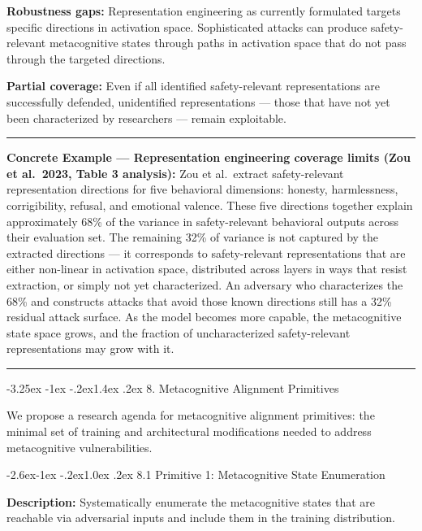 \documentclass[
  11pt,
]{article}
\makeatletter
\renewcommand\section{\@startsection{section}{1}{\z@}%
  {-3.25ex \@plus -1ex \@minus -.2ex}{1.4ex \@plus.2ex}%
  {\normalfont\sffamily\Large\bfseries}}
\renewcommand\subsection{\@startsection{subsection}{2}{\z@}%
  {-2.6ex\@plus -1ex \@minus -.2ex}{1.0ex \@plus .2ex}%
  {\normalfont\sffamily\large\bfseries}}
\renewenvironment{quote}{%
  \par\addvspace{0.7em}%
  \noindent\rule{\linewidth}{1.2pt}\par\nobreak\vspace{2pt}%
  \begingroup
  \small
  \setlength{\parindent}{0pt}\setlength{\parskip}{0.3em}%
  \setlength{\leftskip}{0.9em}\setlength{\rightskip}{0.4em}%
  \ignorespaces
}{%
  \par\endgroup\vspace{2pt}%
  \noindent\rule{\linewidth}{0.4pt}\par\addvspace{0.7em}%
}
\makeatother
\begin{document}
\textbf{Robustness gaps:} Representation engineering as currently
formulated targets specific directions in activation space.
Sophisticated attacks can produce safety-relevant metacognitive states
through paths in activation space that do not pass through the targeted
directions.

\textbf{Partial coverage:} Even if all identified safety-relevant
representations are successfully defended, unidentified representations
--- those that have not yet been characterized by researchers --- remain
exploitable.

\begin{quote}
\textbf{Concrete Example --- Representation engineering coverage limits
(Zou et al.~2023, Table 3 analysis):} Zou et al.~extract safety-relevant
representation directions for five behavioral dimensions: honesty,
harmlessness, corrigibility, refusal, and emotional valence. These five
directions together explain approximately 68\% of the variance in
safety-relevant behavioral outputs across their evaluation set. The
remaining 32\% of variance is not captured by the extracted directions
--- it corresponds to safety-relevant representations that are either
non-linear in activation space, distributed across layers in ways that
resist extraction, or simply not yet characterized. An adversary who
characterizes the 68\% and constructs attacks that avoid those known
directions still has a 32\% residual attack surface. As the model
becomes more capable, the metacognitive state space grows, and the
fraction of uncharacterized safety-relevant representations may grow
with it.
\end{quote}

\section{8. Metacognitive Alignment
Primitives}\label{metacognitive-alignment-primitives}

We propose a research agenda for metacognitive alignment primitives: the
minimal set of training and architectural modifications needed to
address metacognitive vulnerabilities.

\subsection{8.1 Primitive 1: Metacognitive State
Enumeration}\label{primitive-1-metacognitive-state-enumeration}

\textbf{Description:} Systematically enumerate the metacognitive states
that are reachable via adversarial inputs and include them in the
training distribution.
\end{document}
